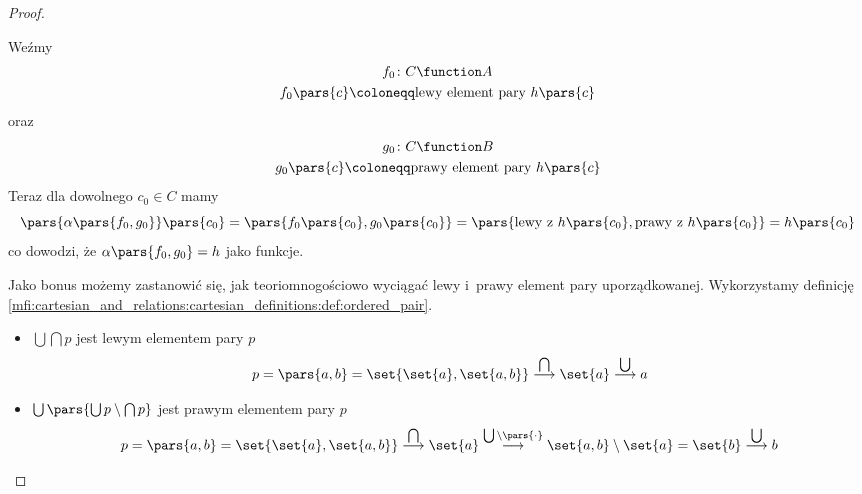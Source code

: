 \begin{proof}
\begin{description}
\begin{equation*}
        \end{equation*}
        Weźmy
        \begin{gather*}
            f_0\colon C \function A\\
            f_0\pars{c} \coloneqq \text{lewy element pary \(h\pars{c}\)}
        \end{gather*}
        oraz
        \begin{gather*}
            g_0\colon C \function B\\
            g_0\pars{c} \coloneqq \text{prawy element pary \(h\pars{c}\)}
        \end{gather*}
        Teraz dla dowolnego \(c_0 \in C\) mamy
        \begin{equation*}
            \pars{\alpha\pars{f_0, g_0}}\pars{c_0}
                = \pars{f_0\pars{c_0}, g_0\pars{c_0}}
                = \pars{\text{lewy z~\(h\pars{c_0}\)}, \text{prawy z~\(h\pars{c_0}\)}}
                = h\pars{c_0}
        \end{equation*}
        co dowodzi, że \(\alpha\pars{f_0, g_0} = h\) jako funkcje.
        
        Jako bonus możemy zastanowić się, jak teoriomnogościowo wyciągać lewy i~prawy element pary uporządkowanej. Wykorzystamy definicję \ref{mfi:cartesian_and_relations:cartesian_definitions:def:ordered_pair}.
        \begin{itemize}
            \item \(\bigcup\bigcap p\) jest lewym elementem pary \(p\)
                \begin{equation*}
                    p = \pars{a, b} = \set{\set{a}, \set{a, b}} \overset{\bigcap}{\longrightarrow} \set{a} \overset{\bigcup}{\longrightarrow} a
                \end{equation*}
            \item \(\bigcup\pars{\bigcup p \setminus \bigcap p}\) jest prawym elementem pary \(p\)
                \begin{equation*}
                    p = \pars{a, b} = \set{\set{a}, \set{a, b}} \overset{\bigcap}{\longrightarrow} \set{a} \overset{\bigcup \setminus \pars{\mathord{\cdot}}}{\longrightarrow} \set{a, b} \setminus \set{a} = \set{b} \overset{\bigcup}{\longrightarrow} b
                \end{equation*}
        \end{itemize}
\end{description}
\end{proof}
